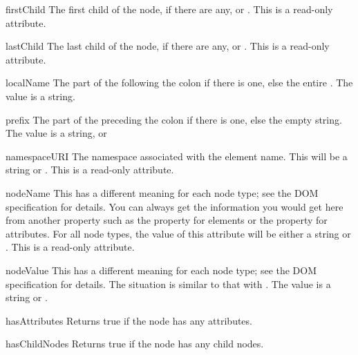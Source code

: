 \begin{memberdesc}[Node]{firstChild}
The first child of the node, if there are any, or .
This is a read-only attribute.
\end{memberdesc}

\begin{memberdesc}[Node]{lastChild}
The last child of the node, if there are any, or .
This is a read-only attribute.
\end{memberdesc}

\begin{memberdesc}[Node]{localName}
The part of the  following the colon if there is one,
else the entire .  The value is a string.
\end{memberdesc}

\begin{memberdesc}[Node]{prefix}
The part of the  preceding the colon if there is one,
else the empty string.  The value is a string, or 
\end{memberdesc}

\begin{memberdesc}[Node]{namespaceURI}
The namespace associated with the element name.  This will be a
string or .  This is a read-only attribute.
\end{memberdesc}

\begin{memberdesc}[Node]{nodeName}
This has a different meaning for each node type; see the DOM
specification for details.  You can always get the information you
would get here from another property such as the 
property for elements or the  property for attributes.
For all node types, the value of this attribute will be either a
string or .  This is a read-only attribute.
\end{memberdesc}

\begin{memberdesc}[Node]{nodeValue}
This has a different meaning for each node type; see the DOM
specification for details.  The situation is similar to that with
.  The value is a string or .
\end{memberdesc}

\begin{methoddesc}[Node]{hasAttributes}{}
Returns true if the node has any attributes.
\end{methoddesc}

\begin{methoddesc}[Node]{hasChildNodes}{}
Returns true if the node has any child nodes.
\end{methoddesc}

